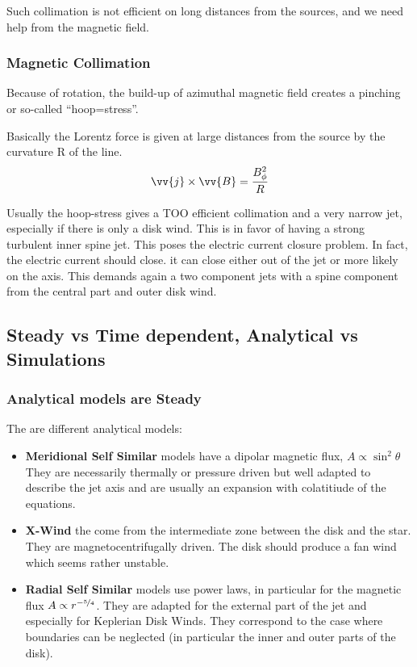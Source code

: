 \documentclass[10pt,a4paper,english]{article}
\begin{document}

Such collimation is not efficient on long distances from the sources, and we need help from the magnetic field.

\subsubsection{Magnetic Collimation}
Because of rotation, the build-up of azimuthal magnetic field creates a pinching or so-called ``hoop=stress''.


Basically the Lorentz force is given at large distances from the source by the curvature R of the line.
\begin{equation}
    \vv{j} \times \vv{B} = \frac{B^2_{\phi}}{R}
\end{equation}

Usually the hoop-stress gives a TOO efficient collimation and a very narrow jet, especially if there is only a disk wind.
This is in favor of having a strong turbulent inner spine jet. This poses the electric current closure problem. In fact,
the electric current should close. it can close either out of the jet or more likely  on the axis. This demands again a
two component jets with a spine component  from the central part and outer disk wind.
\subsection{Steady vs Time dependent, Analytical vs Simulations}

\subsubsection{Analytical models are Steady}
The are different analytical models:
\begin{itemize}
    \item \textbf{Meridional Self Similar} models have a dipolar magnetic flux, $A \propto \sin^2\theta$ They are necessarily thermally or pressure driven but well adapted to describe the jet axis and are usually an expansion with colatitiude of the equations.
    \item \textbf{X-Wind} the come from the intermediate zone between the disk and the star. They are magnetocentrifugally driven. The disk should produce a fan wind which seems rather unstable.
    \item \textbf{Radial Self Similar} models use power laws, in particular for the magnetic flux $A \propto r^{-\nicefrac{5}{4}}$. They are adapted for the external part of the jet and especially for Keplerian Disk Winds. They correspond to the case where boundaries can be neglected (in particular the inner and outer parts of the disk).

\end{itemize}
\end{document}
